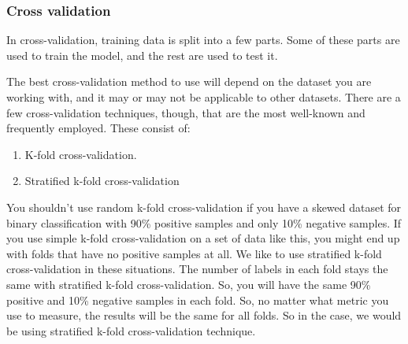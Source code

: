 


\subsubsection{Cross validation}
In cross-validation, training data is split into a few parts. Some of these parts are used to train the model, and the rest are used to test it.

The best cross-validation method to use will depend on the dataset you are working with, and it may or may not be applicable to other datasets. There are a few cross-validation techniques, though, that are the most well-known and frequently employed. These consist of:

\begin{enumerate}[label=(\alph*)]
	\item K-fold cross-validation.
	\item Stratified k-fold cross-validation
\end{enumerate}

You shouldn't use random k-fold cross-validation if you have a skewed dataset for binary classification with 90\% positive samples and only 10\% negative samples. If you use simple k-fold cross-validation on a set of data like this, you might end up with folds that have no positive samples at all. We like to use stratified k-fold cross-validation in these situations. The number of labels in each fold stays the same with stratified k-fold cross-validation. So, you will have the same 90\% positive and 10\% negative samples in each fold. So, no matter what metric you use to measure, the results will be the same for all folds. So in the case, we would be using stratified k-fold cross-validation technique.

